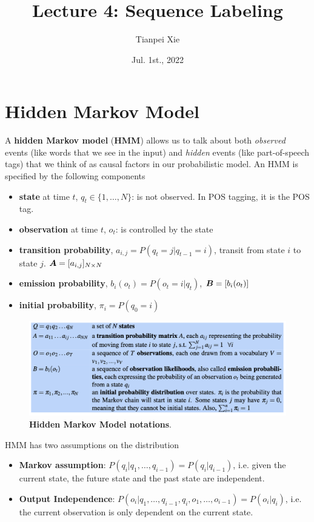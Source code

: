 \documentclass[11pt]{article}
\begin{document}
\title{Lecture 4: Sequence Labeling}
\author{ Tianpei Xie}
\date{ Jul. 1st., 2022 }
\maketitle
\tableofcontents
\newpage
\allowdisplaybreaks
\section{Hidden Markov Model}
A \textbf{hidden Markov model} (\textbf{HMM}) allows us to talk about both \emph{observed} events (like words that we see in the input) and \emph{hidden} events (like part-of-speech tags) that we think of as causal factors in our probabilistic model. An HMM is specified by the following components \citep{jurafsky2014speech}
\begin{itemize}
\item \textbf{state} at time $t$, $q_{t} \in \{1,\ldots, N\} $: is not observed. In POS tagging, it is the POS tag.
\item \textbf{observation} at time $t$, $o_{t}$: is controlled by the state
\item \textbf{transition probability}, $a_{i,j} = P(q_{t} = j | q_{t-1} = i)$, transit from state $i$ to state $j$. $\boldsymbol{A} = [a_{i,j}]_{N\times N}$ 
\item \textbf{emission probability}, $b_{i}(o_{t}) = P(o_{t}=i | q_{t})$, $\boldsymbol{B} = [b_{i}(o_t)]$
\item \textbf{initial probability}, $\pi_{i} = P(q_{0} = i)$
\end{itemize}
\begin{figure}
\begin{minipage}[t]{1\linewidth}
  \centering
  \centerline{\includegraphics[scale = 0.4]{hmm_notations.png}}
\end{minipage}
\caption{\footnotesize{\textbf{Hidden Markov Model notations}.}}
\label{fig: hmm}
\end{figure}

HMM has two assumptions on the distribution
\begin{itemize}
\item \textbf{Markov assumption}: $P(q_{i}| q_{1},\ldots, q_{i-1}) = P(q_{i}| q_{i-1})$, i.e. given the current state, the future state and the past state are independent. 
\item \textbf{Output Independence}: $P(o_{i}| q_{1},\ldots, q_{i-1}, q_{i}, o_{1}, \ldots, o_{i-1}) = P(o_{i}| q_{i})$, i.e. the current observation is only dependent on the current state.
\end{itemize}
\end{document}
